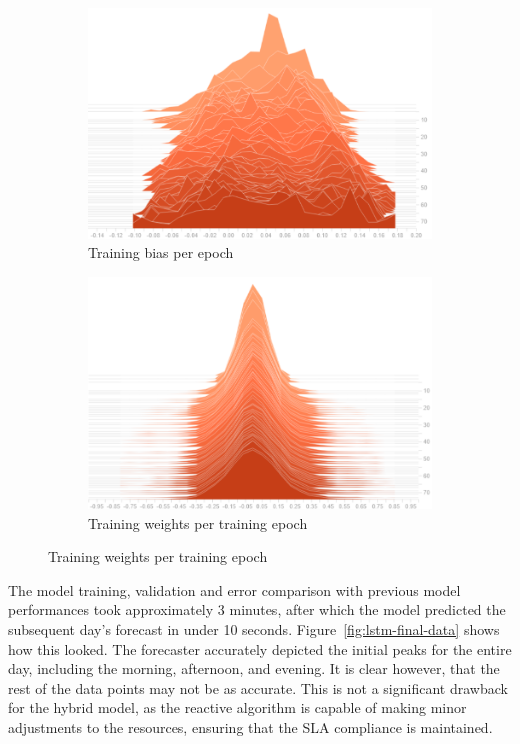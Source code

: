 \begin{figure}[htb]
    \centering
    \caption{Analysis of bias and weights in training}
    \label{fig:bias-weight-training}
    \begin{subfigure}[b]{0.6\linewidth}
        \caption{Training bias per epoch}
        \label{fig:bias-training}
        \includegraphics[width=1.0\linewidth]{Figures/LSTM-Bias.pdf}
    \end{subfigure}
    \par\bigskip
    \begin{subfigure}[b]{0.6\linewidth}
        \caption{Training weights per training epoch}
        \label{fig:weight-training}
        \includegraphics[width=1.0\linewidth]{Figures/LSTM-Weights.pdf}
    \end{subfigure}
\end{figure}

The model training, validation and error comparison with previous model performances took approximately 3 minutes, after which the model predicted the subsequent day's forecast in under 10 seconds. Figure~\ref{fig:lstm-final-data} shows how this looked. The forecaster accurately depicted the initial peaks for the entire day, including the morning, afternoon, and evening. It is clear however, that the rest of the data points may not be as accurate. This is not a significant drawback for the hybrid model, as the reactive algorithm is capable of making minor adjustments to the resources, ensuring that the SLA compliance is maintained.

